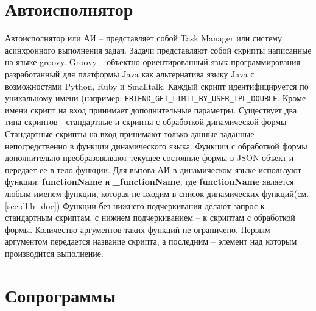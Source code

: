 \documentclass[../index.tex]{subfiles}
\begin{document}
\section{Автоисполнятор}
Автоисполнятор или АИ -- представляет собой Task Manager или систему асинхронного выполнения задач. Задачи представляют собой скрипты написанные на языке groovy. Groovy -- объектно-ориентированный язык программирования разработанный для платформы Java как альтернатива языку Java с возможностями Python, Ruby и Smalltalk. Каждый скрипт идентифицируется по уникальному имени (например: \verb|FRIEND_GET_LIMIT_BY_USER_TPL_DOUBLE|. 
Кроме имени скрипт на вход принимает дополнительные параметры. 
Существует два типа скриптов - стандартные и скрипты с обработкой динамической формы
Стандартные скрипты на вход принимают только данные заданные непосредственно в функции динамического языка. Функции с обработкой формы дополнительно преобразовывают текущее состояние формы в JSON объект и передает ее в тело функции.
Для вызова АИ в динамическом языке используют функции: \textbf{functionName}  и \textbf{\_functionName}, где \textbf{functionName} является любым именем функции, которая не входим в список динамических функций(см. \autoref{sec:dlib_doc})
Функции без нижнего подчеркивания делают запрос к стандартным скриптам, с нижнем подчеркиванием -- к скриптам с обработкой формы.
Количество аргументов таких функций не ограничено. Первым аргументом передается название скрипта, а последним -- элемент над которым производится выполнение.

\section{Сопрограммы}
\end{document}
